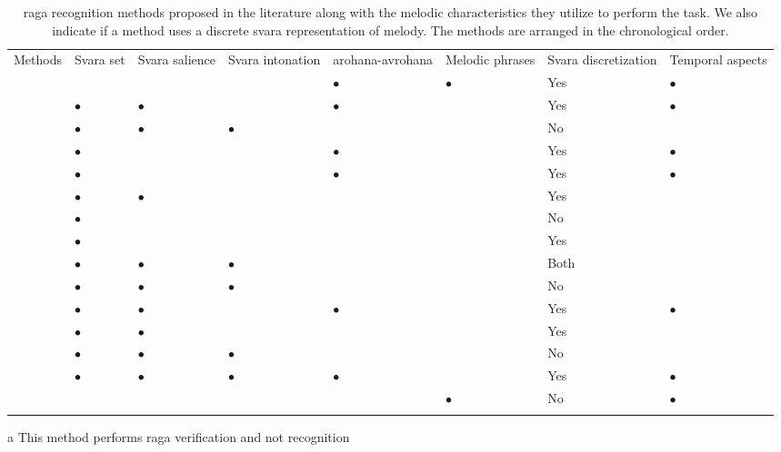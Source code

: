 \begin{table}
	\begin{threeparttable} 
		\setlength{\tabcolsep}{1pt}
		\small
		\begin{centering}
			\begin{tabular}{l L{2cm} L{2cm} L{2.5cm} L{2.5cm} L{2cm} L{2.5cm} L{2cm}}
				\tabletop
				Methods & Svara set & Svara salience & Svara intonation & \Gls{arohana}-\gls{avrohana} & Melodic phrases & Svara discretization & Temporal aspects\tabularnewline
				\tablemid
				\cite{pandey2003tansen} &  &  &  & $\bullet$ & $\bullet$ & Yes & $\bullet$\tabularnewline
				\cite{chordia2007raag} & $\bullet$ & $\bullet$ &  & $\bullet$ &  & Yes & $\bullet$\tabularnewline
				\cite{belle2009raga} & $\bullet$ & $\bullet$ & $\bullet$ &  &  & No & \tabularnewline
				\cite{Shetty2009} & $\bullet$ &  &  & $\bullet$ &  & Yes & $\bullet$\tabularnewline
				\cite{sridhar2009raga} & $\bullet$ &  &  & $\bullet$ &  & Yes & $\bullet$\tabularnewline
				\cite{koduri2011survey} & $\bullet$ & $\bullet$ &  &  &  & Yes & \tabularnewline
				\cite{ranjani2011carnatic} & $\bullet$ &  &  &  &  & No & \tabularnewline
				\cite{chakraborty2012object} & $\bullet$ &  &  &  &  & Yes & \tabularnewline
				\cite{koduri2012raga} & $\bullet$ & $\bullet$ & $\bullet$ &  &  & Both & \tabularnewline
				\cite{chordia2013joint} & $\bullet$ & $\bullet$ & $\bullet$ &  &  & No & \tabularnewline
				\cite{dighe2013scale} & $\bullet$ & $\bullet$ &  & $\bullet$ &  & Yes & $\bullet$\tabularnewline
				\cite{dighe2013swara} & $\bullet$ & $\bullet$ &  &  &  & Yes & \tabularnewline
				\cite{koduri2014intonation} & $\bullet$ & $\bullet$ & $\bullet$ &  &  & No & \tabularnewline
				\cite{kumar2014identifying} & $\bullet$ & $\bullet$ & $\bullet$ & $\bullet$ &  & Yes & $\bullet$\tabularnewline
				\cite{shrey_ISMIR_2015} &  &  &  &  & $\bullet$ & No & $\bullet$\tabularnewline	
				\tablebot
			\end{tabular}
			\par \end{centering}
		
		\begin{tablenotes}
			\item[a] This method performs \gls{raga} verification and not recognition
		\end{tablenotes}
		\caption{\Gls{raga} recognition methods proposed in the literature along with the melodic characteristics they utilize to perform the task. We also indicate if a method uses a discrete \gls{svara} representation of melody. The methods are arranged in the chronological order. }
		\label{tab:raga_recognition_methods_melodic_characteristics}
	\end{threeparttable}
\end{table}



